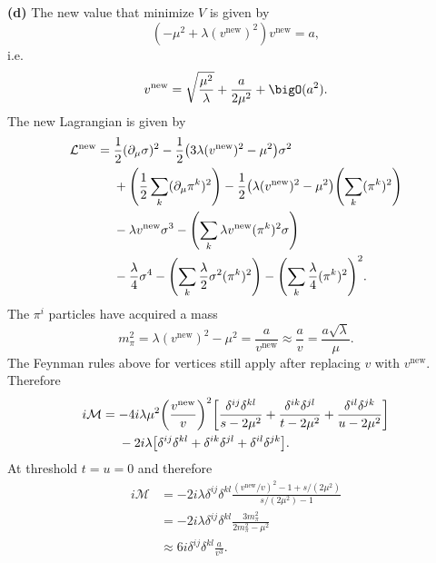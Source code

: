 \documentclass{article}
\makeatletter
\newcommand*{\shifttext}[1]{%
  \settowidth{\@tempdima}{#1}%
  \hspace{-\@tempdima}#1%
}
\newcommand{\plabel}[1]{%
\shifttext{\textbf{#1}\quad}%
}
\newcommand{\prule}{%
\begin{center}%
\hdashrule[0.5ex]{.99\linewidth}{1pt}{1pt 2.5pt}%
\end{center}%
}
\makeatother
\begin{document}
\plabel{(d)}%
The new value that minimize $V$ is given by
\[ (-\mu^2 + \lambda (v^{\mathrm{new}})^2)v^{\mathrm{new}} = a, \]
i.e.
\[ v^{\mathrm{new}} = \sqrt{\frac{\mu^2}{\lambda}} + \frac{a}{2\mu^2} + \bigO(a^2). \]
The new Lagrangian is given by
\begin{align*}
  \mathcal{L}^{\mathrm{new}} &= \frac{1}{2}(\partial_\mu \sigma)^2 - \frac{1}{2}\qty(3\lambda (v^{\mathrm{new}})^2 - \mu^2)\sigma^2 \\
  &\phantom{{}={}} + \qty(\frac{1}{2} \sum_k (\partial_\mu \pi^k)^2) - \frac{1}{2}\qty(\lambda(v^{\mathrm{new}})^2 - \mu^2)\qty(\sum_k (\pi^k)^2) \\
  &\phantom{{}={}} - \lambda v^{\mathrm{new}}\sigma^3 - \qty(\sum_k \lambda v^{\mathrm{new}} (\pi^k)^2\sigma) \\
  &\phantom{{}={}} - \frac{\lambda}{4}\sigma^4 - \qty(\sum_k \frac{\lambda}{2} \sigma^2 (\pi^k)^2) - \qty(\sum_k \frac{\lambda}{4}(\pi^k)^2)^2.
\end{align*}
The $\pi^i$ particles have acquired a mass
\[ m_\pi^2 = \lambda(v^{\mathrm{new}})^2 - \mu^2 = \frac{a}{v^{\mathrm{new}}} \approx \frac{a}{v} = \frac{a\sqrt{\lambda}}{\mu}. \]
The Feynman rules above for vertices still apply after replacing $v$ with $v^{\mathrm{new}}$.
Therefore
\begin{align*}
  i\mathcal{M} &= -4i\lambda \mu^2 \qty(\frac{v^{\mathrm{new}}}{v})^2 \qty[\frac{\delta^{ij}\delta^{kl}}{s - 2\mu^2} + \frac{\delta^{ik}\delta^{jl}}{t - 2\mu^2} + \frac{\delta^{il}\delta^{jk}}{u - 2\mu^2}] \\
  &\phantom{{}={}} - 2i\lambda \qty[\delta^{ij} \delta^{kl} + \delta^{ik}\delta^{jl} + \delta^{il}\delta^{jk}].
\end{align*}
At threshold $t = u = 0$ and therefore
\begin{align*}
  i\mathcal{M} &= - 2i\lambda \delta^{ij} \delta^{kl} \frac{(v^{\mathrm{new}}/v)^2 - 1 + s/(2\mu^2)}{s/(2\mu^2) - 1} \\
  &= - 2i\lambda \delta^{ij} \delta^{kl} \frac{3m_\pi^2}{2m_\pi^2 - \mu^2} \\
  &\approx 6i \delta^{ij} \delta^{kl} \frac{a}{v^3}.
\end{align*}

\prule
\end{document}
